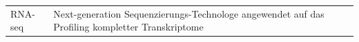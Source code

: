 \documentclass[a4paper]{thesis}
\begin{document}
\begin{tabularx}{\textwidth}{lX}
	  RNA-seq
	& Next-generation Sequenzierungs-Technologe angewendet auf
          das Profiling kompletter Transkriptome
\\
\end{tabularx}

{
	\renewcommand\listfigurename{Abbildungsverzeichnis}
	\tocsection{}\listoffigures
}

\nocite{*}
\ifxetex
	\printbibliography[
		title=Quellenverzeichnis,
		heading=subbibnumbered,
	]
\else
	
	
\fi
\end{document}
